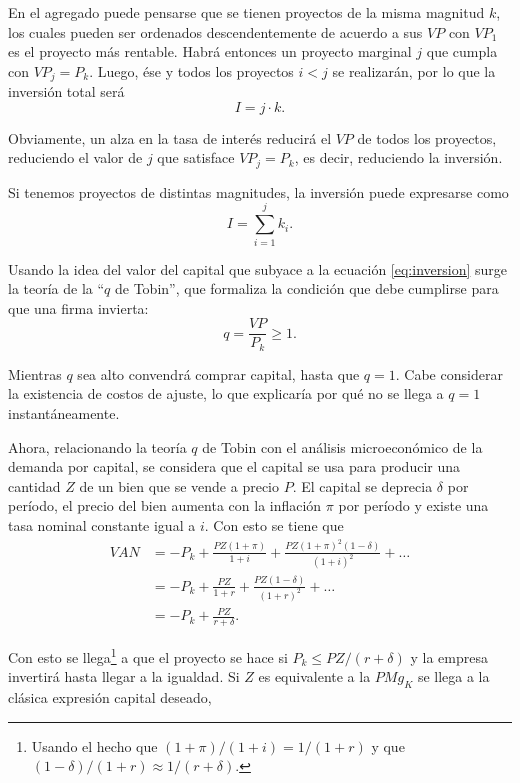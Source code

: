 \documentclass[DeGregorioResumen]{subfiles}
\begin{document}
En el agregado puede pensarse que se tienen proyectos de la misma magnitud $k$, los cuales pueden ser ordenados descendentemente de acuerdo a sus $VP$ con $VP_1 $ es el proyecto más rentable. Habrá entonces un proyecto marginal $j$ que cumpla con $VP_j=P_k$. Luego, ése y todos los proyectos $i<j$ se realizarán, por lo que la inversión total será
\begin{equation}
I=j\cdot k.
\label{eq:inversion}
\end{equation}

Obviamente, un alza en la tasa de interés reducirá el $VP$ de todos los proyectos, reduciendo el valor de $j$ que satisface $VP_j=P_k$, es decir, reduciendo la inversión.

Si tenemos proyectos de distintas magnitudes, la inversión puede expresarse como
\begin{equation*}
I=\sum_{i=1}^{j}{k_i}.
\end{equation*}

Usando la idea del valor del capital que subyace a la ecuación \eqref{eq:inversion} surge la teoría de la ``$q$ de Tobin'', que formaliza la condición que debe cumplirse para que una firma invierta:
\begin{equation}
q=\frac{VP}{P_k}\geq 1.
\label{eq:qtobin}
\end{equation}

Mientras $q$ sea alto convendrá comprar capital, hasta que $q=1$. Cabe considerar la existencia de costos de ajuste, lo que explicaría por qué no se llega a $q=1$ instantáneamente.

Ahora, relacionando la teoría $q$ de Tobin con el análisis microeconómico de la demanda por capital, se considera que el capital se usa para producir una cantidad $Z$ de un bien que se vende a precio $P$. El capital se deprecia $\delta$ por período, el precio del bien aumenta con la inflación $\pi$ por período y existe una tasa nominal constante igual a $i$. Con esto se tiene que
\begin{align*}
VAN &= -P_k + \frac{PZ(1+\pi)}{1+i} + \frac{PZ(1+\pi)^2(1-\delta)}{(1+i)^2}+\ldots \\
&= -P_k + \frac{PZ}{1+r} + \frac{PZ(1-\delta)}{(1+r)^2}+\ldots \\
&= -P_k + \frac{PZ}{r+\delta}.
\end{align*}

Con esto se llega\footnote{Usando el hecho que $(1+\pi)/(1+i)=1/(1+r)$ y que $(1-\delta)/(1+r)\approx 1/(r+\delta)$.} a que el proyecto se hace si $P_k\leq PZ/(r+\delta)$ y la empresa invertirá hasta llegar a la igualdad. Si $Z$ es equivalente a la $PMg_K$ se llega a la clásica expresión capital deseado,
\end{document}
